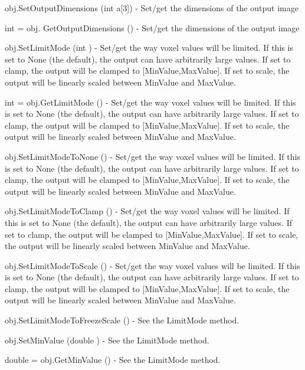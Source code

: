 \begin{DoxyItemize}
\item {\ttfamily obj.\-Set\-Output\-Dimensions (int a\mbox{[}3\mbox{]})} -\/ Set/get the dimensions of the output image  
\item {\ttfamily int = obj. Get\-Output\-Dimensions ()} -\/ Set/get the dimensions of the output image  
\item {\ttfamily obj.\-Set\-Limit\-Mode (int )} -\/ Set/get the way voxel values will be limited. If this is set to None (the default), the output can have arbitrarily large values. If set to clamp, the output will be clamped to \mbox{[}Min\-Value,Max\-Value\mbox{]}. If set to scale, the output will be linearly scaled between Min\-Value and Max\-Value.  
\item {\ttfamily int = obj.\-Get\-Limit\-Mode ()} -\/ Set/get the way voxel values will be limited. If this is set to None (the default), the output can have arbitrarily large values. If set to clamp, the output will be clamped to \mbox{[}Min\-Value,Max\-Value\mbox{]}. If set to scale, the output will be linearly scaled between Min\-Value and Max\-Value.  
\item {\ttfamily obj.\-Set\-Limit\-Mode\-To\-None ()} -\/ Set/get the way voxel values will be limited. If this is set to None (the default), the output can have arbitrarily large values. If set to clamp, the output will be clamped to \mbox{[}Min\-Value,Max\-Value\mbox{]}. If set to scale, the output will be linearly scaled between Min\-Value and Max\-Value.  
\item {\ttfamily obj.\-Set\-Limit\-Mode\-To\-Clamp ()} -\/ Set/get the way voxel values will be limited. If this is set to None (the default), the output can have arbitrarily large values. If set to clamp, the output will be clamped to \mbox{[}Min\-Value,Max\-Value\mbox{]}. If set to scale, the output will be linearly scaled between Min\-Value and Max\-Value.  
\item {\ttfamily obj.\-Set\-Limit\-Mode\-To\-Scale ()} -\/ Set/get the way voxel values will be limited. If this is set to None (the default), the output can have arbitrarily large values. If set to clamp, the output will be clamped to \mbox{[}Min\-Value,Max\-Value\mbox{]}. If set to scale, the output will be linearly scaled between Min\-Value and Max\-Value.  
\item {\ttfamily obj.\-Set\-Limit\-Mode\-To\-Freeze\-Scale ()} -\/ See the Limit\-Mode method.  
\item {\ttfamily obj.\-Set\-Min\-Value (double )} -\/ See the Limit\-Mode method.  
\item {\ttfamily double = obj.\-Get\-Min\-Value ()} -\/ See the Limit\-Mode method.  

\end{DoxyItemize}
